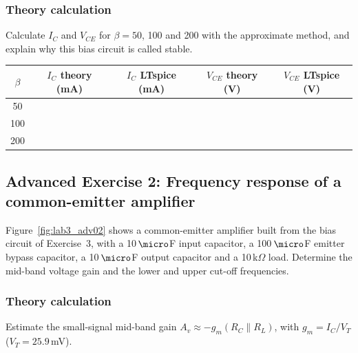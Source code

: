 \subsubsection{Theory calculation}\vspace{-3pt}\notesblock Calculate $I_C$ and $V_{CE}$ for $\beta=50$, 100 and 200 with the approximate method, and explain why this bias circuit is called stable.

\begin{center}\renewcommand{\arraystretch}{1.8}\begin{tabular}{|c|c|c|c|c|}\hline \textbf{$\beta$} & \textbf{$I_C$ theory (mA)} & \textbf{$I_C$ LTspice (mA)} & \textbf{$V_{CE}$ theory (V)} & \textbf{$V_{CE}$ LTspice (V)}\\ \hline 50 & & & & \\ \hline 100 & & & & \\ \hline 200 & & & & \\ \hline \end{tabular}\end{center}
\newpage

\subsection{Advanced Exercise 2: Frequency response of a common-emitter amplifier}
Figure~\ref{fig:lab3_adv02} shows a common-emitter amplifier built from the bias circuit of Exercise~3, with a 10\,$\micro$F input capacitor, a 100\,$\micro$F emitter bypass capacitor, a 10\,$\micro$F output capacitor and a 10\,k$\Omega$ load. Determine the mid-band voltage gain and the lower and upper cut-off frequencies.


\subsubsection{Theory calculation}\vspace{-3pt}\notesblock Estimate the small-signal mid-band gain $A_v\approx-g_m(R_C\parallel R_L)$, with $g_m=I_C/V_T$ ($V_T=25.9$\,mV).

